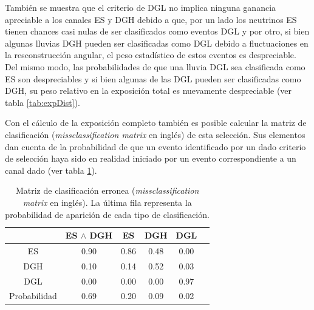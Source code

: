 	También se muestra que el criterio de DGL no implica ninguna ganancia apreciable a los canales ES y DGH debido a que, por un lado los neutrinos ES tienen chances casi nulas de ser clasificados como eventos DGL y por otro, si bien algunas lluvias DGH pueden ser clasificadas como DGL debido a fluctuaciones en la resconstrucción angular, el peso estadístico de estos eventos es despreciable.
	Del mismo modo, las probabilidades de que una lluvia DGL sea clasificada como ES son despreciables y si bien algunas de las DGL pueden ser clasificadas como DGH, su peso relativo en la exposición total es nuevamente despreciable (ver tabla \ref{tab:expDist}).
	
	
	Con el cálculo de la exposición completo también es posible calcular la matriz de clasificación (\emph{missclassification matrix} en inglés) de esta selección.
	Sus elementos dan cuenta de la probabilidad de que un evento identificado por un dado criterio de selección haya sido en realidad iniciado por un evento correspondiente a un canal dado (ver tabla \ref{tab:missclass}).
	\begin{table}[ht!]
		\begin{center}
		\renewcommand{\arraystretch}{1.4}
			\begin{tabular}{|c|c|c|c|c|c|}
			\hline
			\diagbox{Lluvia}{Criterio} & ES $\wedge$ DGH &  ES    &  DGH   &  DGL      \\ \hline
			ES                         & 0.90            &  0.86  &  0.48  &  0.00     \\ \hline
			DGH                        & 0.10            &  0.14  &  0.52  &  0.03     \\ \hline
			DGL                        & 0.00            &  0.00  &  0.00  &  0.97     \\ \hline\hline
			Probabilidad               & 0.69            &  0.20  &  0.09  &  0.02     \\
			\hline
			\end{tabular}
		\end{center}
		\label{tab:missclass}
		\caption{Matriz de clasificación erronea (\emph{missclassification matrix} en inglés). La última fila representa la probabilidad de aparición de cada tipo de clasificación.}
	\end{table}
